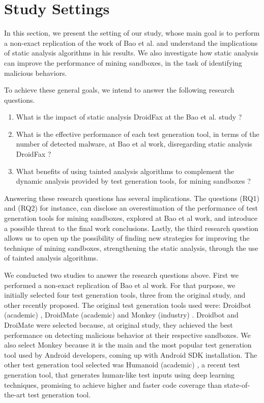 \section{Study Settings}

In this section, we present the setting of our study, whose main goal is to perform a non-exact replication of the work of Bao et al. and understand the implications of static analysis algorithms in his results. We also investigate how static analysis can improve the performance of mining sandboxes, in the task of identifying malicious behaviors.

To achieve these general goals, we intend to answer the following research questions.

\begin{enumerate}[(RQ1)]
\item What is the impact of static analysis DroidFax at the Bao et al. study ?
\item What is the effective performance of each test generation tool, in terms of the number of detected malware, at Bao et al work, disregarding static analysis DroidFax ?
\item What benefits of using tainted analysis algorithms to complement the dynamic analysis provided by test generation tools, for mining sandboxes ?
\end{enumerate}

Answering these research questions has several implications. The questions (RQ1) and (RQ2) for instance, can disclose an overestimation of the performance of test generation tools for mining sandboxes, explored at Bao et al work, and introduce a possible threat to the final work conclusions. Lastly, the third research question allows us to open up the possibility of finding new strategies for improving the technique of mining sandboxes, strengthening the static analysis, through the use of tainted analysis algorithms.

We conducted two studies to answer the research questions above. First we performed a non-exact replication of Bao et al work. For that purpose, we initially selected four test generation tools, three from the original study, and other recently proposed. The original test generation tools used were: Droidbot (academic) \cite{DBLP:conf/icse/LiYGC17}, DroidMate  (academic) \cite{DBLP:conf/icse/JamrozikZ16} and Monkey (industry) \cite{Monkey}. Droidbot and DroiMate were selected because, at original study, they achieved the best performance on detecting malicious behavior at their respective sandboxes. We also select Monkey because it is the main and the most popular test generation tool used by Android developers, coming up with Android SDK installation. The other test generation tool selected was Humanoid (academic) \cite{DBLP:conf/kbse/LiY0C19}, a recent test generation tool, that generates human-like test inputs using deep learning techniques, promising to achieve higher and faster code coverage than state-of-the-art test generation tool. 

